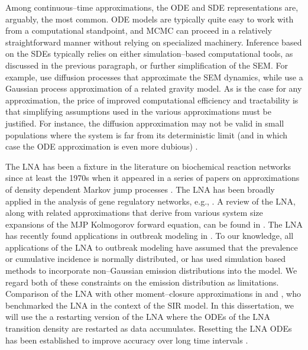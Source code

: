 Among continuous--time approximations, the ODE and SDE representations are, arguably, the most common. ODE models are typically quite easy to work with from a computational standpoint, and MCMC can proceed in a relatively straightforward manner without relying on specialized machinery. Inference based on the SDEs typically relies on either simulation--based computational tools, as discussed in the previous paragraph, or further simplification of the SEM. For example, \cite{cauchemez2004bayesian,cauchemez2008,roberts2001} use diffusion processes that approximate the SEM dynamics, while \cite{jandarov2014} use a Gaussian process approximation of a related gravity model. As is the case for any approximation, the price of improved computational efficiency and tractability is that simplifying assumptions used in the various approximations must be justified. For instance, the diffusion approximation may not be valid in small populations where the system is far from its deterministic limit (and in which case the ODE approximation is even more dubious) \cite{andersson2000stochastic}.

The LNA has been a fixture in the literature on biochemical reaction networks since at least the 1970s when it appeared in a series of papers on approximations of density dependent Markov jump processes \cite{kurtz1970solutions,kurtz1971limit}. The LNA has been broadly applied in the analysis of gene regulatory networks, e.g., \cite{finkenstadt2013quantifying,giagos2010inference,hey2015stochastic,komorowski2009,stathopoulos2013markov,thomas2012slow,zimmer2015deterministic}. A review of the LNA, along with related approximations that derive from various system size expansions of the MJP Kolmogorov forward equation, can be found in \cite{schnoerr2017approximation,wallace2012linear}. The LNA has recently found applications in outbreak modeling in \cite{black2010stochastic,fearnhead2014,golightly2015delayed,golightly2018bridge,ross2009parameter,ross2012parameter,rebuli2017hybrid,zimmer2017likelihood}. To our knowledge, all applications of the LNA to outbreak modeling have assumed that the prevalence or cumulative incidence is normally distributed, or has used simulation based methods to incorporate non--Gaussian emission distributions into the model. We regard both of these constraints on the emission distribution as limitations. Comparison of the LNA with other moment--closure approximations in \cite{grima2012study} and \cite{buckingham2018gaussian}, who benchmarked the LNA in the context of the SIR model. In this dissertation, we will use the a restarting version of the LNA where the ODEs of the LNA transition density are restarted as data accumulates. Resetting the LNA ODEs has been established to improve accuracy over long time intervals \cite{fearnhead2014,folia2017trajectory,giagos2010inference}.

